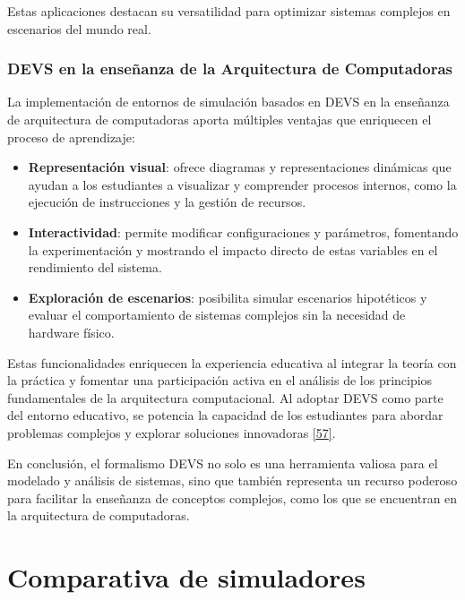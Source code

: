 \documentclass[12pt,oneside]{templates/unerthesis}
\providecommand{\tightlist}{%
  \setlength{\itemsep}{0pt}\setlength{\parskip}{0pt}}
\begin{document}
Estas aplicaciones destacan su versatilidad para optimizar sistemas complejos en escenarios del mundo real.

\hypertarget{devs-en-la-enseuxf1anza-de-la-arquitectura-de-computadoras}{%
\subsection{DEVS en la enseñanza de la Arquitectura de Computadoras}\label{devs-en-la-enseuxf1anza-de-la-arquitectura-de-computadoras}}

La implementación de entornos de simulación basados en DEVS en la enseñanza de arquitectura de computadoras aporta múltiples ventajas que enriquecen el proceso de aprendizaje:

\begin{itemize}
\tightlist
\item
  \textbf{Representación visual}: ofrece diagramas y representaciones dinámicas que ayudan a los estudiantes a visualizar y comprender procesos internos, como la ejecución de instrucciones y la gestión de recursos.
\item
  \textbf{Interactividad}: permite modificar configuraciones y parámetros, fomentando la experimentación y mostrando el impacto directo de estas variables en el rendimiento del sistema.
\item
  \textbf{Exploración de escenarios}: posibilita simular escenarios hipotéticos y evaluar el comportamiento de sistemas complejos sin la necesidad de hardware físico.
\end{itemize}

Estas funcionalidades enriquecen la experiencia educativa al integrar la teoría con la práctica y fomentar una participación activa en el análisis de los principios fundamentales de la arquitectura computacional. Al adoptar DEVS como parte del entorno educativo, se potencia la capacidad de los estudiantes para abordar problemas complejos y explorar soluciones innovadoras \protect\hyperlink{ref-calvo_valdes_simulador_2010}{{[}57{]}}.

En conclusión, el formalismo DEVS no solo es una herramienta valiosa para el modelado y análisis de sistemas, sino que también representa un recurso poderoso para facilitar la enseñanza de conceptos complejos, como los que se encuentran en la arquitectura de computadoras.

\hypertarget{comparativa}{%
\chapter{Comparativa de simuladores}\label{comparativa}}
\end{document}
